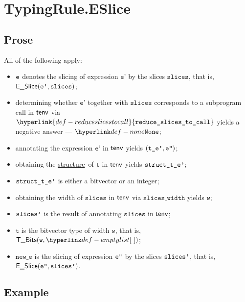 \documentclass{book}
\newcommand\ProseOrTypeError[0]{\ProseTerminateAs{\TypeErrorConfig}}
\newcommand\structure[0]{\hyperlink{def-structure}{structure}}
\newcommand\sliceswidth[0]{\texttt{slices\_width}}
\newcommand\reduceslicestocall[0]{\hyperlink{def-reduceslicestocall}{\texttt{reduce\_slices\_to\_call}}}
\newcommand\vt[0]{\texttt{t}}
\newcommand\vw[0]{\texttt{w}}
\newcommand\slices[0]{\texttt{slices}}
\newcommand\newe[0]{\texttt{new\_e}}
\newcommand\vep[0]{\texttt{e'}}
\begin{document}

\section{TypingRule.ESlice \label{sec:TypingRule.ESlice}}

\subsection{Prose}
All of the following apply:
\begin{itemize}
  \item $\texttt{e}$ denotes the slicing of expression $\vep$ by the slices $\slices$, that is, \\
  $\ESlice(\vep, \slices)$;
  \item determining whether $\vep$ together with $\slices$ corresponds to a subprogram call
  in $\textsf{tenv}$ via $\reduceslicestocall$ yields a negative answer --- $\None$\ProseOrTypeError;
  \item annotating the expression $\vep$ in $\textsf{tenv}$ yields $(\texttt{t\_e'},\texttt{e''})$\ProseOrTypeError;
  \item obtaining the \structure\ of $\vt$ in $\textsf{tenv}$ yields $\texttt{struct\_t\_e'}$\ProseOrTypeError;
  \item $\texttt{struct\_t\_e'}$ is either a bitvector or an integer;
  \item obtaining the width of $\slices$ in $\textsf{tenv}$ via $\sliceswidth$ yields $\vw$\ProseOrTypeError;
  \item $\texttt{slices'}$ is the result of annotating $\slices$ in $\textsf{tenv}$;
  \item $\vt$ is the bitvector type of width $\vw$, that is, $\TBits(\vw, \emptylist)$;
  \item $\newe$ is the slicing of expression $\texttt{e''}$ by the slices $\texttt{slices'}$, that is, \\
  $\textsf{E\_Slice}(\texttt{e''}, \texttt{slices'})$.
\end{itemize}

\subsection{Example}

\end{document}
